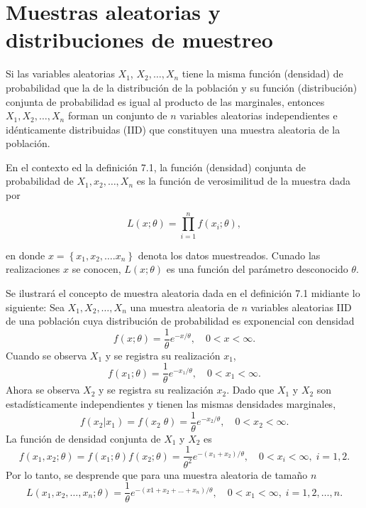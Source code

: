 \chapter{Muestras aleatorias y distribuciones de muestreo}

\begin{def.}
    Si las variables aleatorias $X_1$, $X_2,\ldots, X_n$ tiene la misma función (densidad) de probabilidad que la de la distribución de la población y su función (distribución) conjunta de probabilidad es igual al producto de las marginales, entonces $X_1,X_2,\ldots , X_n$ forman un conjunto de $n$ variables aleatorias independientes e idénticamente distribuidas (IID) que constituyen una muestra aleatoria de la población.
\end{def.}

En el contexto ed la definición 7.1, la función (densidad) conjunta de probabilidad de $X_1,x_2,\ldots,X_n$ es la función de verosimilitud de la muestra dada por
\begin{tcolorbox}
    $$ L(x;\theta)=\prod\limits_{i=1}^n f(x_i; \theta),$$
\end{tcolorbox}
    en donde $x=\left\{x_1,x_2,\ldots.x_n\right\}$ denota los datos muestreados. Cunado las realizaciones $x$ se conocen, $L(x;\theta)$ es una función del parámetro desconocido $\theta$. 

\begin{ejem}
    Se ilustrará el concepto de muestra aleatoria dada en el definición 7.1 midiante lo siguiente: Sea $X_1,X_2,\ldots,X_n$ una muestra aleatoria de $n$ variables aleatorias IID de una población cuya distribución de probabilidad es exponencial con densidad
    $$f(x;\theta)=\dfrac{1}{\theta}e^{-x/\theta},\quad 0<x<\infty.$$
    Cuando se observa $X_1$ y se registra su realización $x_1$,
    $$f(x_1;\theta)=\dfrac{1}{\theta}e^{-x_1/\theta},\quad 0<x_1<\infty.$$
    Ahora se observa $X_2$ y se registra su realización $x_2$. Dado que $X_1$ y $X_2$ son estadísticamente independientes y tienen las mismas densidades marginales,
    $$f(x_2|x_1)=f(x_2\; \theta)=\dfrac{1}{\theta}e^{-x_2/\theta},\quad 0<x_2<\infty.$$
    La función de densidad conjunta de $X_1$ y $X_2$ es
    $$f(x_1,x_2;\theta)=f(x_1;\theta)f(x_2;\theta)=\dfrac{1}{\theta^2}e^{-(x_1+x_2)/\theta},\quad 0<x_i<\infty,\; i=1,2.$$
    Por lo tanto, se desprende que para una muestra aleatoria de tamaño $n$
    $$L(x_1,x_2,\ldots,x_n; \theta)=\dfrac{1}{\theta}e^{-(x1+x_2+\ldots +x_n)/\theta},\quad 0<x_1<\infty,\; i=1,2,\ldots,n.$$
\end{ejem}

